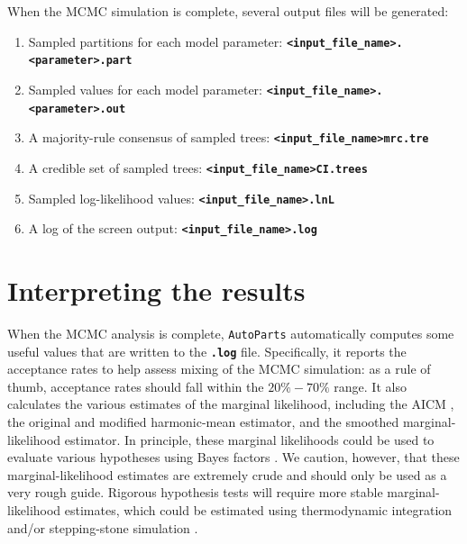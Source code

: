 \documentclass[11pt]{article}
\newcommand{\cl}[1]{{\texttt{\textbf{#1}}}}
\begin{document}
When the MCMC simulation is complete, several output files will be generated:\\ \vspace{-7mm}
\begin{enumerate}

\item{Sampled partitions for each model parameter: \cl{<input\_file\_name>.<parameter>.part}} \\ \vspace{-7mm}

\item{Sampled values for each model parameter: \cl{<input\_file\_name>.<parameter>.out}} \\ \vspace{-7mm}

\item{A majority-rule consensus of sampled trees: \cl{<input\_file\_name>mrc.tre}} \\ \vspace{-7mm}

\item{A credible set of sampled trees: \cl{<input\_file\_name>CI.trees}} \\ \vspace{-7mm}

\item{Sampled log-likelihood values: \cl{<input\_file\_name>.lnL}} \\ \vspace{-7mm}

\item{A log of the screen output: \cl{<input\_file\_name>.log}} \\ \vspace{-7mm}

\end{enumerate}

\bigskip
\section*{Interpreting the results}

When the MCMC analysis is complete, \verb!AutoParts! automatically computes some useful values that are written to the \cl{.log} file.
Specifically, it reports the acceptance rates to help assess mixing of the MCMC simulation: as a rule of thumb, acceptance rates should fall within the $20\%-70\%$ range.
It also calculates the various estimates of the marginal likelihood, including the AICM \citep[][]{Raftery07}, the original \citep{newton94} and modified \citep[][]{suchard01} harmonic-mean estimator, and the smoothed marginal-likelihood estimator.
In principle, these marginal likelihoods could be used to evaluate various hypotheses using Bayes factors \citep[{\it e.g.},][]{suchard01}.
We caution, however, that these marginal-likelihood estimates are extremely crude and should only be used as a very rough guide.
Rigorous hypothesis tests will require more stable marginal-likelihood estimates, which could be estimated using thermodynamic integration \citep[{\it e.g.},][]{lartillot06} and/or stepping-stone simulation \citep[{\it e.g.},][]{fan11,xie11}.   
\end{document}

